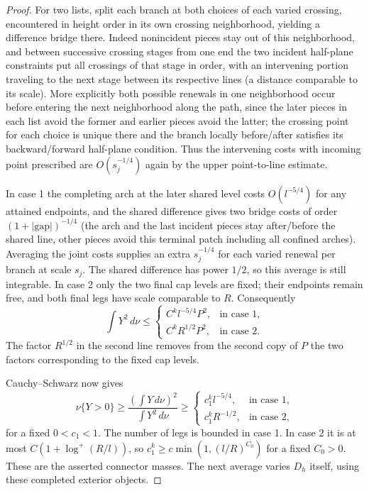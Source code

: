 \begin{proof}
For two lists, split each branch at both choices of each varied crossing, encountered in height order in its own crossing neighborhood, yielding a difference bridge there. Indeed nonincident pieces stay out of this neighborhood, and between successive crossing stages from one end the two incident half-plane constraints put all crossings of that stage in order, with an intervening portion traveling to the next stage between its respective lines (a distance comparable to its scale). More explicitly both possible renewals in one neighborhood occur before entering the next neighborhood along the path, since the later pieces in each list avoid the former and earlier pieces avoid the latter; the crossing point for each choice is unique there and the branch locally before/after satisfies its backward/forward half-plane condition. Thus the intervening costs with incoming point prescribed are \(O(s_j^{-1/4})\) again by the upper point-to-line estimate. 

In case 1 the completing arch at the later shared level costs \(O(l^{-5/4})\) for any attained endpoints, and the shared difference gives two bridge costs of order \((1+|\mathrm{gap}|)^{-1/4}\) (the arch and the last incident pieces stay after/before the shared line, other pieces avoid this terminal patch including all confined arches). Averaging the joint costs supplies an extra \(s_j^{-1/4}\) for each varied renewal per branch at scale \(s_j\). The shared difference has power \(1/2\), so this average is still integrable. In case 2 only the two final cap levels are fixed; their endpoints remain free, and both final legs have scale comparable to \(R\). Consequently
\[
 \int Y^2\,d\nu\le
 \begin{cases}
 C^k l^{-5/4}P^2,&\text{in case 1},\\
 C^k R^{1/2}P^2,&\text{in case 2}.
 \end{cases}
\]
The factor \(R^{1/2}\) in the second line removes from the second copy of \(P\) the two factors corresponding to the fixed cap levels.

Cauchy--Schwarz now gives
\[
 \nu\{Y>0\}\ge\frac{(\int Y\,d\nu)^2}{\int Y^2\,d\nu}
 \ge
 \begin{cases}
 c_1^k l^{-5/4},&\text{in case 1},\\
 c_1^k R^{-1/2},&\text{in case 2},
 \end{cases}
\]
for a fixed \(0<c_1<1\). The number of legs is bounded in case 1. In case 2 it is at most \(C(1+\log^+(R/l))\), so \(c_1^k\ge c\min(1,(l/R)^{C_0})\) for a fixed \(C_0>0\). These are the asserted connector masses. The next average varies \(D_h\) itself, using these completed exterior objects.


\end{proof}
